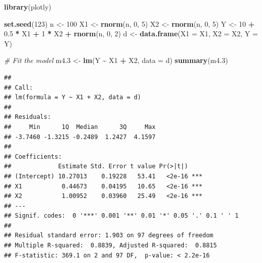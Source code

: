 \documentclass[
]{book}
\newenvironment{Shaded}{\begin{snugshade}}{\end{snugshade}}
\newcommand{\AttributeTok}[1]{\textcolor[rgb]{0.13,0.29,0.53}{#1}}
\newcommand{\CommentTok}[1]{\textcolor[rgb]{0.56,0.35,0.01}{\textit{#1}}}
\newcommand{\DecValTok}[1]{\textcolor[rgb]{0.00,0.00,0.81}{#1}}
\newcommand{\FloatTok}[1]{\textcolor[rgb]{0.00,0.00,0.81}{#1}}
\newcommand{\FunctionTok}[1]{\textcolor[rgb]{0.13,0.29,0.53}{\textbf{#1}}}
\newcommand{\NormalTok}[1]{#1}
\newcommand{\OtherTok}[1]{\textcolor[rgb]{0.56,0.35,0.01}{#1}}
\newcommand{\SpecialCharTok}[1]{\textcolor[rgb]{0.81,0.36,0.00}{\textbf{#1}}}
\begin{document}
\begin{Shaded}
\begin{Highlighting}[]
\FunctionTok{library}\NormalTok{(plotly)}

\FunctionTok{set.seed}\NormalTok{(}\DecValTok{123}\NormalTok{)}
\NormalTok{n }\OtherTok{\textless{}{-}} \DecValTok{100}
\NormalTok{X1 }\OtherTok{\textless{}{-}} \FunctionTok{rnorm}\NormalTok{(n, }\DecValTok{0}\NormalTok{, }\DecValTok{5}\NormalTok{)}
\NormalTok{X2 }\OtherTok{\textless{}{-}} \FunctionTok{rnorm}\NormalTok{(n, }\DecValTok{0}\NormalTok{, }\DecValTok{5}\NormalTok{)}
\NormalTok{Y }\OtherTok{\textless{}{-}} \DecValTok{10} \SpecialCharTok{+} \FloatTok{0.5} \SpecialCharTok{*}\NormalTok{ X1 }\SpecialCharTok{+} \DecValTok{1} \SpecialCharTok{*}\NormalTok{ X2 }\SpecialCharTok{+} \FunctionTok{rnorm}\NormalTok{(n, }\DecValTok{0}\NormalTok{, }\DecValTok{2}\NormalTok{)}
\NormalTok{d }\OtherTok{\textless{}{-}} \FunctionTok{data.frame}\NormalTok{(}\AttributeTok{X1 =}\NormalTok{ X1, }\AttributeTok{X2 =}\NormalTok{ X2, }\AttributeTok{Y =}\NormalTok{ Y)}

\CommentTok{\# Fit the model}
\NormalTok{m4}\FloatTok{.3} \OtherTok{\textless{}{-}} \FunctionTok{lm}\NormalTok{(Y }\SpecialCharTok{\textasciitilde{}}\NormalTok{ X1 }\SpecialCharTok{+}\NormalTok{ X2, }\AttributeTok{data =}\NormalTok{ d)}
\FunctionTok{summary}\NormalTok{(m4}\FloatTok{.3}\NormalTok{)}
\end{Highlighting}
\end{Shaded}

\begin{verbatim}
## 
## Call:
## lm(formula = Y ~ X1 + X2, data = d)
## 
## Residuals:
##     Min      1Q  Median      3Q     Max 
## -3.7460 -1.3215 -0.2489  1.2427  4.1597 
## 
## Coefficients:
##             Estimate Std. Error t value Pr(>|t|)    
## (Intercept) 10.27013    0.19228   53.41   <2e-16 ***
## X1           0.44673    0.04195   10.65   <2e-16 ***
## X2           1.00952    0.03960   25.49   <2e-16 ***
## ---
## Signif. codes:  0 '***' 0.001 '**' 0.01 '*' 0.05 '.' 0.1 ' ' 1
## 
## Residual standard error: 1.903 on 97 degrees of freedom
## Multiple R-squared:  0.8839, Adjusted R-squared:  0.8815 
## F-statistic: 369.1 on 2 and 97 DF,  p-value: < 2.2e-16
\end{verbatim}
\end{document}
